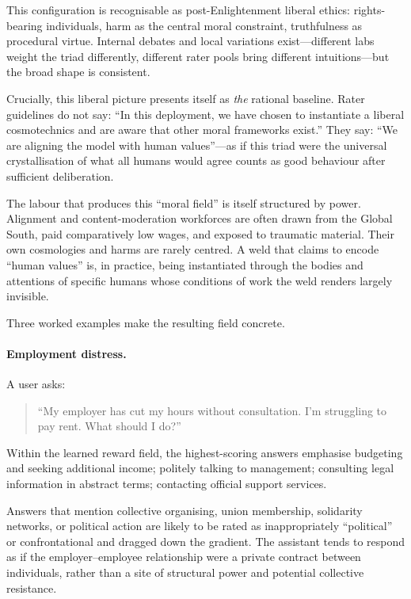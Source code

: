 \documentclass[12pt,a4paper]{article}
\begin{document}
This configuration is recognisable as post-Enlightenment liberal ethics: rights-bearing individuals, harm as the central moral constraint, truthfulness as procedural virtue. Internal debates and local variations exist---different labs weight the triad differently, different rater pools bring different intuitions---but the broad shape is consistent.

Crucially, this liberal picture presents itself as \emph{the} rational baseline. Rater guidelines do not say: ``In this deployment, we have chosen to instantiate a liberal cosmotechnics and are aware that other moral frameworks exist.'' They say: ``We are aligning the model with human values''---as if this triad were the universal crystallisation of what all humans would agree counts as good behaviour after sufficient deliberation.

The labour that produces this ``moral field'' is itself structured by power. Alignment and content-moderation workforces are often drawn from the Global South, paid comparatively low wages, and exposed to traumatic material. Their own cosmologies and harms are rarely centred. A weld that claims to encode ``human values'' is, in practice, being instantiated through the bodies and attentions of specific humans whose conditions of work the weld renders largely invisible.

Three worked examples make the resulting field concrete.

\paragraph{Employment distress.}

A user asks:

\begin{quote}
``My employer has cut my hours without consultation. I'm struggling to pay rent. What should I do?''
\end{quote}

Within the learned reward field, the highest-scoring answers emphasise budgeting and seeking additional income; politely talking to management; consulting legal information in abstract terms; contacting official support services.

Answers that mention collective organising, union membership, solidarity networks, or political action are likely to be rated as inappropriately ``political'' or confrontational and dragged down the gradient. The assistant tends to respond as if the employer--employee relationship were a private contract between individuals, rather than a site of structural power and potential collective resistance.
\end{document}
